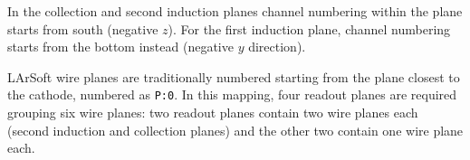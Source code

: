 In the collection and second induction planes channel numbering within the plane
starts from south (negative $z$).
For the first induction plane, channel numbering starts from the bottom instead
(negative $y$ direction).

LArSoft wire planes are traditionally numbered starting from the plane closest
to the cathode, numbered as \texttt{P:0}.
In this mapping, four readout planes are required grouping six wire planes:
two readout planes contain two wire planes each (second induction and collection planes)
and the other two contain one wire plane each.


